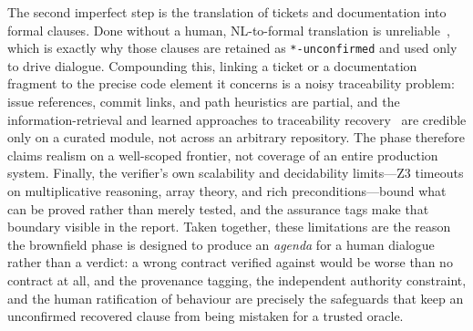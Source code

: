 The second imperfect step is the translation of tickets and documentation into formal clauses. Done without a human, NL-to-formal translation is unreliable~\cite{cosler2023nl2spec,lahiri2025nl2contract}, which is exactly why those clauses are retained as \texttt{*-unconfirmed} and used only to drive dialogue. Compounding this, linking a ticket or a documentation fragment to the precise code element it concerns is a noisy traceability problem: issue references, commit links, and path heuristics are partial, and the information-retrieval and learned approaches to traceability recovery~\cite{antoniol2002recovering,borg2014recovering,lin2021tbert} are credible only on a curated module, not across an arbitrary repository. The phase therefore claims realism on a well-scoped frontier, not coverage of an entire production system. Finally, the verifier's own scalability and decidability limits---Z3 timeouts on multiplicative reasoning, array theory, and rich preconditions---bound what can be proved rather than merely tested, and the assurance tags make that boundary visible in the report. Taken together, these limitations are the reason the brownfield phase is designed to produce an \emph{agenda} for a human dialogue rather than a verdict: a wrong contract verified against would be worse than no contract at all, and the provenance tagging, the independent authority constraint, and the human ratification of behaviour are precisely the safeguards that keep an unconfirmed recovered clause from being mistaken for a trusted oracle.
